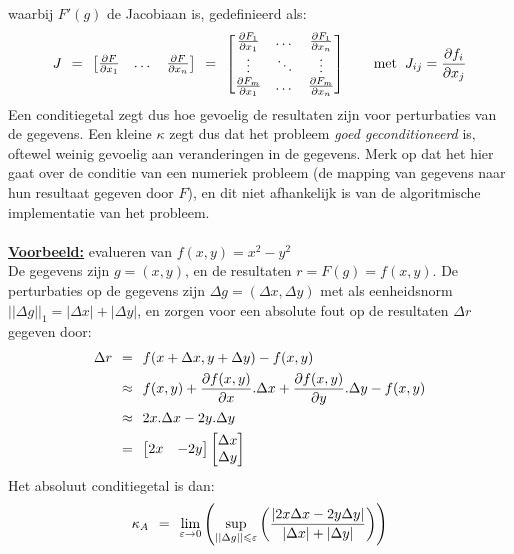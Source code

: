 \documentclass[11pt]{report}
\def \eq {\hspace{1.5mm}=\hspace{1.5mm}}
\def \appx {\hspace{1.5mm}\approx \hspace{1.5mm}}
\def \h {\hspace{2mm}}
\begin{document}
		waarbij $F'(g)$ de Jacobiaan is, gedefinieerd als:
		$$J \eq \begin{bmatrix}
    				\frac{\partial F}{\partial x_1} & \dots & \frac{\partial F}{\partial x_n}
  				\end{bmatrix}
  				\eq
  				\begin{bmatrix}
    				\frac{\partial F_1}{\partial x_1} & \dots & \frac{\partial F_1}{\partial x_n} \\
    				\vdots & \ddots & \vdots \\
    				\frac{\partial F_m}{\partial x_1} & \dots & \frac{\partial F_m}{\partial x_n} \\
  				\end{bmatrix} \hspace{7mm} \text{met}\h J_{ij} =\frac{\partial f_i}{\partial x_j}$$
  		Een conditiegetal zegt dus hoe gevoelig de resultaten zijn voor perturbaties van de gegevens. Een kleine $\kappa$ zegt dus dat het probleem \textit{goed geconditioneerd} is, oftewel weinig gevoelig aan veranderingen in de gegevens. Merk op dat het hier gaat over de conditie van een numeriek probleem (de mapping van gegevens naar hun resultaat gegeven door $F$), en dit niet afhankelijk is van de algoritmische implementatie van het probleem.\\\\
	\textbf{\underline{Voorbeeld:}} evalueren van $f(x, y) = x^2 - y^2$\\
		De gegevens zijn $g = (x, y)$, en de resultaten $r = F(g) = f(x, y)$. De perturbaties op de gegevens	zijn $\Delta g = (\Delta x, \Delta y)$ met als eenheidsnorm $||\Delta g||_1 = |\Delta x| + |\Delta y|$, en zorgen voor een absolute fout op de resultaten $\Delta r$ gegeven door:
		\begin{align*}
			\Delta r &\eq  f(x + \Delta x, y + \Delta y) - f(x, y) \\
			&\appx f(x, y) + \frac{\partial f(x, y)}{\partial x}. \Delta x + \frac{\partial f(x, y)}{\partial y}. \Delta y - f(x, y)\\
			&\appx 2x . \Delta x - 2y . \Delta y\\
			&\eq \begin{bmatrix}2x & -2y\end{bmatrix} \begin{bmatrix}\Delta x \\ \Delta y\end{bmatrix}
		\end{align*}
		Het absoluut conditiegetal is dan:
		$$\kappa_A \eq \lim_{\varepsilon \to 0} \left( \sup_{||\Delta g|| \leqslant \varepsilon}\left(\frac{|2x\Delta x - 2y\Delta y|}{|\Delta x| + | \Delta y|}\right)\right)$$
		
\end{document}
